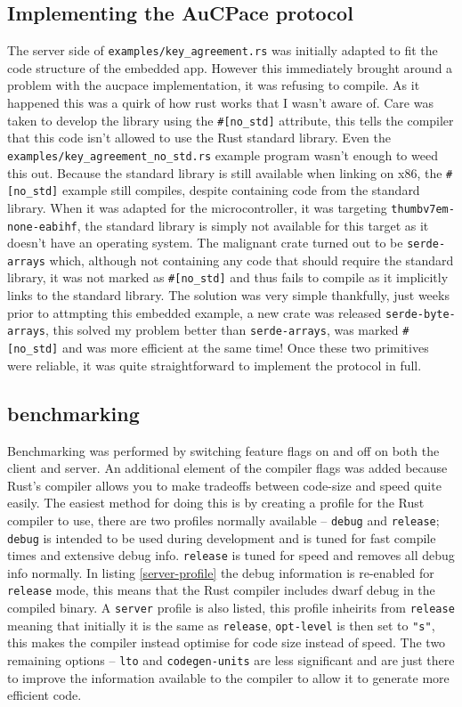 \subsection{Implementing the AuCPace protocol}
The server side of \texttt{examples/key\_agreement.rs} was initially adapted to fit the code structure of the embedded app.
However this immediately brought around a problem with the \gls{aucpace} implementation, it was refusing to compile.
As it happened this was a quirk of how rust works that I wasn't aware of.
Care was taken to develop the library using the \verb|#[no_std]| attribute, this tells the compiler that this code isn't allowed to use the Rust standard library.
Even the \texttt{examples/key\_agreement\_no\_std.rs} example program wasn't enough to weed this out.
Because the standard library is still available when linking on x86, the \verb|#[no_std]| example still compiles, despite containing code from the standard library.
When it was adapted for the microcontroller, it was targeting \texttt{thumbv7em-none-eabihf}, the standard library is simply not available for this target as it doesn't have an operating system.
The malignant crate turned out to be \texttt{serde-arrays} which, although not containing any code that should require the standard library, it was not marked as \verb|#[no_std]| and thus fails to compile as it implicitly links to the standard library.
The solution was very simple thankfully, just weeks prior to attmpting this embedded example, a new crate was released \texttt{serde-byte-arrays}, this solved my problem better than \texttt{serde-arrays}, was marked \verb|#[no_std]| and was more efficient at the same time!
Once these two primitives were reliable, it was quite straightforward to implement the protocol in full.


\subsection{benchmarking}
Benchmarking was performed by switching feature flags on and off on both the client and server.
An additional element of the compiler flags was added because Rust's compiler allows you to make tradeoffs between code-size and speed quite easily.
The easiest method for doing this is by creating a profile for the Rust compiler to use, there are two profiles normally available -- \texttt{debug} and \texttt{release}; \texttt{debug} is intended to be used during development and is tuned for fast compile times and extensive debug info. \texttt{release} is tuned for speed and removes all debug info normally.
In listing \ref{server-profile} the debug information is re-enabled for \texttt{release} mode, this means that the Rust compiler includes \gls{dwarf} debug in the compiled binary.
A \texttt{server} profile is also listed, this profile inheirits from \texttt{release} meaning that initially it is the same as \texttt{release}, \texttt{opt-level} is then set to \texttt{"s"}, this makes the compiler instead optimise for code size instead of speed.
The two remaining options -- \texttt{lto} and \texttt{codegen-units} are less significant and are just there to improve the information available to the compiler to allow it to generate more efficient code.

